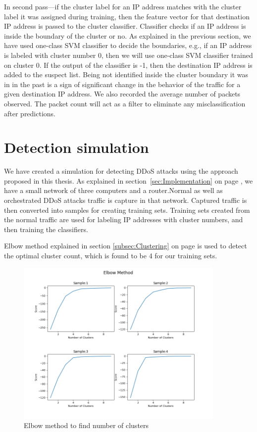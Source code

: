 \documentclass[12pt,oneside,a4paper]{article}
\begin{document}
In second pass---if the cluster label for an IP address matches with the cluster label it was assigned during training, then the feature vector for that destination IP address is passed to the cluster classifier. Classifier checks if an IP address is inside the boundary of the cluster or no. As explained in the previous section, we have used one-class SVM classifier to decide the boundaries, e.g., if an IP address is labeled with cluster number 0, then we will use one-class SVM classifier trained on cluster 0. If the output of the classifier is -1, then the destination IP address is added to the suspect list. Being not identified inside the cluster boundary it was in in the past is a sign of significant change in the behavior of the traffic for a given destination IP address. We also recorded the average number of packets observed. The packet count will act as a filter to eliminate any misclassification after predictions.
\pagebreak
\section{Detection simulation}

We have created a simulation for detecting DDoS attacks using the approach proposed in this thesis. As explained in section~\ref{sec:Implementation} on page \pageref{sec:Implementation}, we have a small network of three computers and a router.Normal as well as orchestrated DDoS attacks traffic is capture in that network. Captured traffic is then converted into samples for creating training sets. Training sets created from the normal traffic are used for labeling IP addresses with cluster numbers, and then training the classifiers.

Elbow method explained in section \ref{subsec:Clustering} on page \pageref{subsec:Clustering} is used to detect the optimal cluster count, which is found to be 4 for our training sets.

\begin{figure}[H]
\centering
\includegraphics[width=0.90\textwidth]{elbow-method-applied.png}
\caption{Elbow method to find number of clusters}
\label{fig:elbow-method-applied}
\end{figure}
\end{document}
